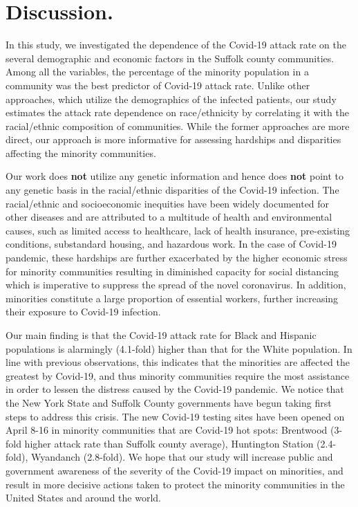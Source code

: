 \documentclass[twoside,12pt,onecolumn]{article}
\begin{document}
\section{Discussion.}
In this study, we investigated the dependence of the Covid-19 attack rate on the several demographic and economic factors in the Suffolk county communities. Among all the variables, the percentage of the minority population in a community was the best predictor of Covid-19 attack rate. Unlike other approaches, which utilize the demographics of the infected patients, our study estimates the attack rate dependence on race/ethnicity by correlating it with the racial/ethnic composition of communities. While the former approaches are more direct, our approach is more informative for assessing hardships and disparities affecting the minority communities.

Our work does \textbf{not} utilize any genetic information and hence does \textbf{not} point to any genetic basis in the racial/ethnic disparities of the Covid-19 infection. The racial/ethnic and socioeconomic inequities have been widely documented for other diseases and are attributed to a multitude of health and environmental causes, such as limited access to healthcare, lack of health insurance, pre-existing conditions, substandard housing, and hazardous work. In the case of Covid-19 pandemic, these hardships are further exacerbated by the higher economic stress for minority communities resulting in diminished capacity for social distancing which is imperative to suppress the spread of the novel coronavirus. In addition, minorities constitute a large proportion of essential workers, further increasing their exposure to Covid-19 infection.

Our main finding is that the Covid-19 attack rate for Black and Hispanic populations is alarmingly (4.1-fold) higher than that for the White population. In line with previous observations, this indicates that the minorities are affected the greatest by Covid-19, and thus minority communities require the most assistance in order to lessen the distress caused by the Covid-19 pandemic. We notice that the New York State and Suffolk County governments have begun taking first steps to address this crisis. The new Covid-19 testing sites have been opened on April 8-16  in minority communities that are Covid-19 hot spots: Brentwood (3-fold higher attack rate than Suffolk county average), Huntington Station (2.4-fold), Wyandanch (2.8-fold). We hope that our study will increase public and government awareness of the severity of the Covid-19 impact on minorities, and result in more decisive actions taken to protect the minority communities in the United States and around the world.
\end{document}
